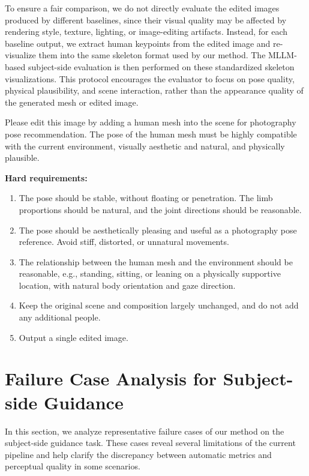 \documentclass{article} %
\begin{document}
To ensure a fair comparison, we do not directly evaluate the edited images produced by different baselines, since their visual quality may be affected by rendering style, texture, lighting, or image-editing artifacts. Instead, for each baseline output, we extract human keypoints from the edited image and re-visualize them into the same skeleton format used by our method. The MLLM-based subject-side evaluation is then performed on these standardized skeleton visualizations. This protocol encourages the evaluator to focus on pose quality, physical plausibility, and scene interaction, rather than the appearance quality of the generated mesh or edited image.

\begin{promptbox}
\small

Please edit this image by adding a human mesh into the scene for photography pose recommendation. The pose of the human mesh must be highly compatible with the current environment, visually aesthetic and natural, and physically plausible.

\vspace{0.5em}
\noindent\textbf{Hard requirements:}
\begin{enumerate}
    \item The pose should be stable, without floating or penetration. The limb proportions should be natural, and the joint directions should be reasonable.
    \item The pose should be aesthetically pleasing and useful as a photography pose reference. Avoid stiff, distorted, or unnatural movements.
    \item The relationship between the human mesh and the environment should be reasonable, e.g., standing, sitting, or leaning on a physically supportive location, with natural body orientation and gaze direction.
    \item Keep the original scene and composition largely unchanged, and do not add any additional people.
    \item Output a single edited image.
\end{enumerate}
\end{promptbox}
\section{Failure Case Analysis for Subject-side Guidance}
\label{app:limitations}

In this section, we analyze representative failure cases of our method on the subject-side guidance task. These cases reveal several limitations of the current pipeline and help clarify the discrepancy between automatic metrics and perceptual quality in some scenarios.
\end{document}
